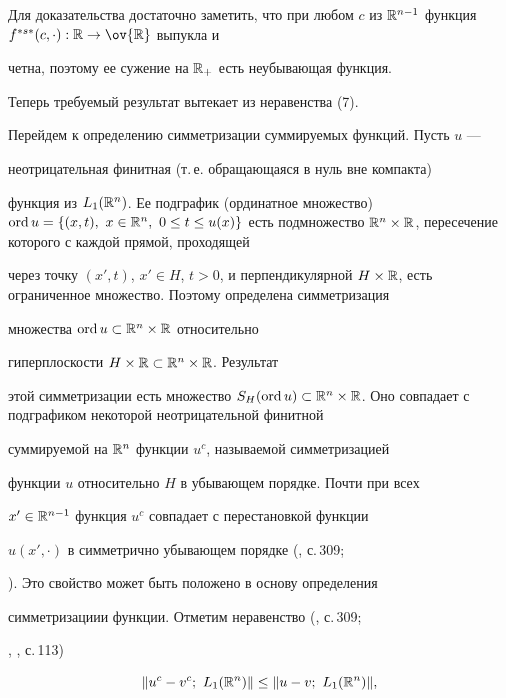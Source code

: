  


Для доказательства достаточно заметить, что при любом $c$ из $\Bbb 


R^{n-1}$ функция $f^{*s*}(c,\cdot):\Bbb R\to\ov{\Bbb R}$ выпукла и 


четна, поэтому ее сужение на $\Bbb R_+$ есть неубывающая функция. 


Теперь требуемый результат вытекает из неравенства (7). 


 


Перейдем к определению симметризации суммируемых функций. Пусть $u$ --- 


неотрицательная финитная (т.\,е. обращающаяся в нуль вне компакта) 


функция из $L_1(\Bbb R^n)$. Ее подграфик (ординатное множество) $\Ord 


u=\{(x,t),\ x\in\Bbb R^n,\ 0\le t\le u(x)\}$ есть подмножество $\Bbb 


R^n\times\Bbb R$, пересечение которого с каждой прямой, проходящей 


через точку $(x',t)$, $x'\in H$, $t>0$, и перпендикулярной $H\times\Bbb 


R$, есть ограниченное множество. Поэтому определена симметризация 


множества $\operatorname{ord} u\subset\Bbb R^n\times\Bbb R$ относительно 


гиперплоскости $H\times\Bbb R\subset\Bbb R^n\times\Bbb R$. Результат 


этой симметризации есть множество $S_H(\Ord u)\subset\Bbb R^n\times\Bbb 


R$. Оно совпадает с подграфиком некоторой неотрицательной финитной 


суммируемой на $\Bbb R^n$ функции $u^c$, называемой симметризацией 


функции $u$ относительно $H$ в убывающем порядке. Почти при всех


$x'\in\Bbb R^{n-1}$ функция $u^c$ совпадает с перестановкой функции 


$u(x',\cdot)$ в симметрично убывающем порядке (\cite{5}, с.\,309; 


\cite{6}). Это свойство может быть положено в основу определения 


симметризациии функции. Отметим неравенство (\cite{5}, с.\,309; 


\cite{6}, \cite{7}, с.\,113) 


\begin{equation} 


\|u^c-v^c;\ L_1(\Bbb R^n)\|\le\|u-v;\ L_1(\Bbb R^n)\|, 


\end{equation} 


